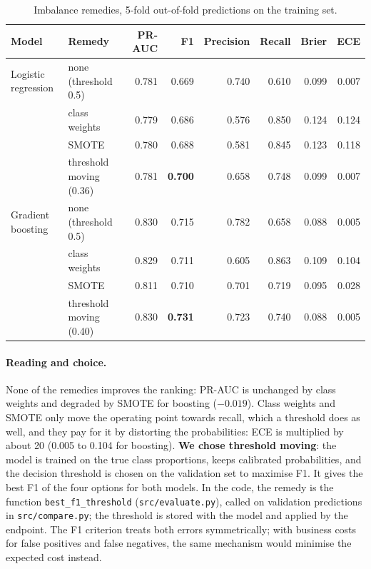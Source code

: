 \documentclass[11pt,a4paper]{article}
\newcommand{\code}[1]{\texttt{#1}}
\begin{document}
\begin{table}[H]\centering\small
\begin{tabular}{llrrrrrr}\toprule
Model & Remedy & PR-AUC & F1 & Precision & Recall & Brier & ECE\\\midrule
Logistic regression & none (threshold 0.5) & 0.781 & 0.669 & 0.740 & 0.610 & 0.099 & 0.007\\
 & class weights & 0.779 & 0.686 & 0.576 & 0.850 & 0.124 & 0.124\\
 & SMOTE & 0.780 & 0.688 & 0.581 & 0.845 & 0.123 & 0.118\\
 & threshold moving (0.36) & 0.781 & \textbf{0.700} & 0.658 & 0.748 & 0.099 & 0.007\\\midrule
Gradient boosting & none (threshold 0.5) & 0.830 & 0.715 & 0.782 & 0.658 & 0.088 & 0.005\\
 & class weights & 0.829 & 0.711 & 0.605 & 0.863 & 0.109 & 0.104\\
 & SMOTE & 0.811 & 0.710 & 0.701 & 0.719 & 0.095 & 0.028\\
 & threshold moving (0.40) & 0.830 & \textbf{0.731} & 0.723 & 0.740 & 0.088 & 0.005\\\bottomrule
\end{tabular}
\caption{Imbalance remedies, 5-fold out-of-fold predictions on the training set.}\label{tab:imb}
\end{table}

\paragraph{Reading and choice.} None of the remedies improves the ranking: PR-AUC is unchanged by
class weights and degraded by SMOTE for boosting ($-0.019$). Class weights and SMOTE only move the
operating point towards recall, which a threshold does as well, and they pay for it by distorting
the probabilities: ECE is multiplied by about 20 (0.005 to 0.104 for boosting). \textbf{We chose
threshold moving}: the model is trained on the true class proportions, keeps calibrated
probabilities, and the decision threshold is chosen on the validation set to maximise F1. It gives
the best F1 of the four options for both models. In the code, the remedy is the function
\code{best\_f1\_threshold} (\code{src/evaluate.py}), called on validation predictions in
\code{src/compare.py}; the threshold is stored with the model and applied by the endpoint.
The F1 criterion treats both errors symmetrically; with business costs for false positives and
false negatives, the same mechanism would minimise the expected cost instead.
\end{document}
